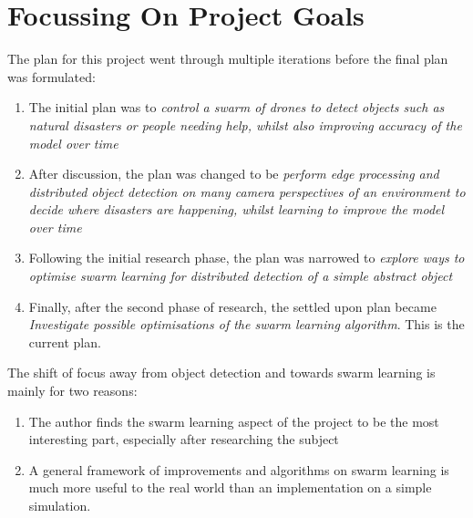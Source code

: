 \section{Focussing On Project Goals}
The plan for this project went through multiple iterations before the final plan was formulated:
\begin{enumerate}
	\item The initial plan was to \emph{control a swarm of drones to detect objects such as natural disasters or people needing help, whilst also improving accuracy of the model over time}
	\item After discussion, the plan was changed to be \emph{perform edge processing and distributed object detection on many camera perspectives of an environment to decide where disasters are happening, whilst learning to improve the model over time}
	\item Following the initial research phase, the plan was narrowed to \emph{explore ways to optimise swarm learning for distributed detection of a simple abstract object}
	\item Finally, after the second phase of research, the settled upon plan became \emph{Investigate possible optimisations of the swarm learning algorithm}. This is the current plan.
\end{enumerate}
The shift of focus away from object detection and towards swarm learning is mainly for two reasons:
\begin{enumerate}
	\item The author finds the swarm learning aspect of the project to be the most interesting part, especially after researching the subject
	\item A general framework of improvements and algorithms on swarm learning is much more useful to the real world than an implementation on a simple simulation.
\end{enumerate}
